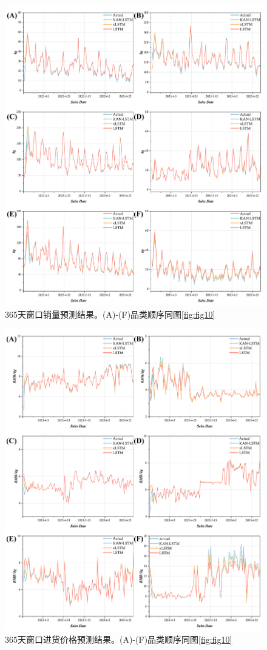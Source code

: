 \documentclass[lang=cn,12pt,a4paper]{elegantpaper}
\begin{document}
\begin{figure}[H]
    \centering
    \includegraphics[width=1\textwidth]{图片12.png}
    \caption{365天窗口销量预测结果。(A)-(F)品类顺序同图\ref{fig:fig10}}
    \label{fig:fig12}
\end{figure}

\begin{figure}[H]
    \centering
    \includegraphics[width=1\textwidth]{图片13.png}
    \caption{365天窗口进货价格预测结果。(A)-(F)品类顺序同图\ref{fig:fig10}}
    \label{fig:fig13}
\end{figure}
\end{document}
